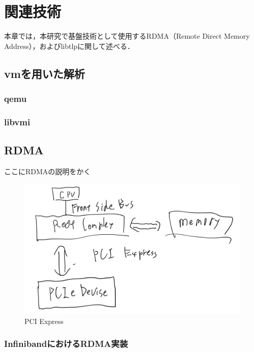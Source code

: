 \chapter{関連技術}
\label{chap:related_works}

本章では，本研究で基盤技術として使用するRDMA（Remote Direct Memory Address），およびlibtlpに関して述べる．

\section{vmを用いた解析}

\subsection{qemu}

\subsection{libvmi}

\section{RDMA}

ここにRDMAの説明をかく

\begin{figure}[htbp]
    \caption{PCI Express}
    \label{fig:zentai}
    \begin{center}
        \includegraphics[bb=0 0 1000 400,width=15cm]{img/tegaki/pcie.png}
    \end{center}
\end{figure}

\subsection{InfinibandにおけるRDMA実装}


